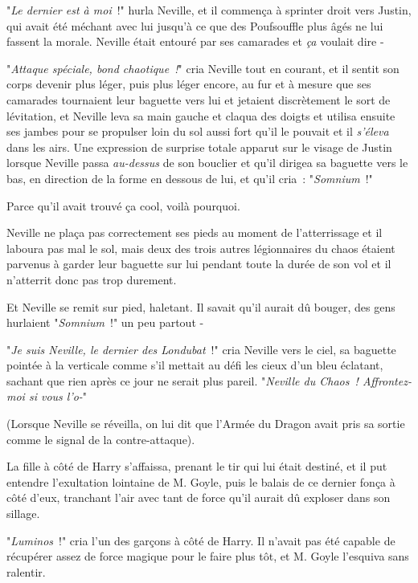"\emph{Le dernier est à moi}~!" hurla Neville, et il commença à sprinter droit vers Justin, qui avait été méchant avec lui jusqu'à ce que des Poufsouffle plus âgés ne lui fassent la morale. Neville était entouré par ses camarades et \emph{ça} voulait dire -

"\emph{Attaque spéciale, bond chaotique~!}" cria Neville tout en courant, et il sentit son corps devenir plus léger, puis plus léger encore, au fur et à mesure que ses camarades tournaient leur baguette vers lui et jetaient discrètement le sort de lévitation, et Neville leva sa main gauche et claqua des doigts et utilisa ensuite ses jambes pour se propulser loin du sol aussi fort qu'il le pouvait et il \emph{s'éleva} dans les airs. Une expression de surprise totale apparut sur le visage de Justin lorsque Neville passa \emph{au-dessus} de son bouclier et qu'il dirigea sa baguette vers le bas, en direction de la forme en dessous de lui, et qu'il cria~: "\emph{Somnium}~!"

Parce qu'il avait trouvé ça cool, voilà pourquoi.

Neville ne plaça pas correctement ses pieds au moment de l'atterrissage et il laboura pas mal le sol, mais deux des trois autres légionnaires du chaos étaient parvenus à garder leur baguette sur lui pendant toute la durée de son vol et il n'atterrit donc pas trop durement.

Et Neville se remit sur pied, haletant. Il savait qu'il aurait dû bouger, des gens hurlaient "\emph{Somnium}~!" un peu partout -

"\emph{Je suis Neville, le dernier des Londubat}~!" cria Neville vers le ciel, sa baguette pointée à la verticale comme s'il mettait au défi les cieux d'un bleu éclatant, sachant que rien après ce jour ne serait plus pareil. "\emph{Neville du Chaos~! Affrontez-moi si vous l'o-}"

(Lorsque Neville se réveilla, on lui dit que l'Armée du Dragon avait pris sa sortie comme le signal de la contre-attaque).

\later

La fille à côté de Harry s'affaissa, prenant le tir qui lui était destiné, et il put entendre l'exultation lointaine de M. Goyle, puis le balais de ce dernier fonça à côté d'eux, tranchant l'air avec tant de force qu'il aurait dû exploser dans son sillage.

"\emph{Luminos}~!" cria l'un des garçons à côté de Harry. Il n'avait pas été capable de récupérer assez de force magique pour le faire plus tôt, et M. Goyle l'esquiva sans ralentir.

